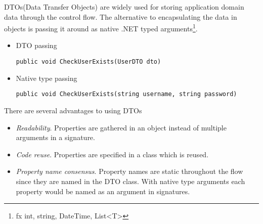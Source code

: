 \documentclass[../report.tex]{subfiles}
\begin{document}
\label{sec:dto}



DTOs(Data Transfer Objects) are widely used for storing application domain data through the control flow. The alternative to encapsulating the data in objects is passing it around as native .NET typed arguments\footnote{fx int, string, DateTime, List<T>}.





\begin{itemize}
\item DTO passing
\begin{center}
\begin{lstlisting}
public void CheckUserExists(UserDTO dto)
\end{lstlisting}
\end{center}

\item Native type passing
\begin{center}
\begin{lstlisting}
public void CheckUserExists(string username, string password)
\end{lstlisting}
\end{center}
\end{itemize}

There are several advantages to using DTOs

\begin{itemize}
\item \textit{Readability}. Properties are gathered in an object instead of multiple arguments in a signature.

\item \textit{Code reuse}. Properties are specified in a class which is reused.

\item \textit{Property name consensus}. Property names are static throughout the flow since they are named in the DTO class. With native type arguments each property would be named as an argument in signatures.
\end{itemize}
\end{document}
